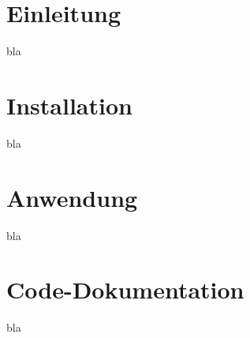 \documentclass[paper=a4,fontsize=11pt,headsepline,footsepline,parskip=half]{scrartcl}
\begin{document}
\tableofcontents

\section{Einleitung}

bla

\section{Installation}

bla

\section{Anwendung}

bla

\section{Code-Dokumentation}

bla
\end{document}
